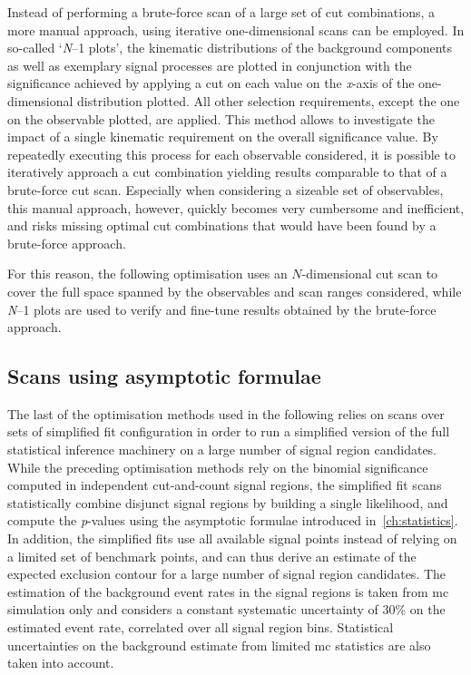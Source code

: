 Instead of performing a brute-force scan of a large set of cut combinations, a more manual approach, using iterative one-dimensional scans can be employed. In so-called `\textit{N}--1 plots', the kinematic distributions of the background components as well as exemplary signal processes are plotted in conjunction with the significance achieved by applying a cut on each value on the \textit{x}-axis of the one-dimensional distribution plotted. All other selection requirements, except the one on the observable plotted, are applied. This method allows to investigate the impact of a single kinematic requirement on the overall significance value. By repeatedly executing this process for each observable considered, it is possible to iteratively approach a cut combination yielding results comparable to that of a brute-force cut scan. Especially when considering a sizeable set of observables, this manual approach, however, quickly becomes very cumbersome and inefficient, and risks missing optimal cut combinations that would have been found by a brute-force approach.

For this reason, the following optimisation uses an $N$-dimensional cut scan to cover the full space spanned by the observables and scan ranges considered, while \textit{N}--1 plots are used to verify and fine-tune results obtained by the brute-force approach.

\subsection{Scans using asymptotic formulae}\label{sec:fit-scan}

The last of the optimisation methods used in the following relies on scans over sets of simplified fit configuration in order to run a simplified version of the full statistical inference machinery on a large number of signal region candidates.
While the preceding optimisation methods rely on the binomial significance computed in independent cut-and-count signal regions, the simplified fit scans statistically combine disjunct signal regions by building a single likelihood, and compute the \textit{p}-values using the asymptotic formulae introduced in~\cref{ch:statistics}.
In addition, the simplified fits use all available signal points instead of relying on a limited set of benchmark points, and can thus derive an estimate of the expected exclusion contour for a large number of signal region candidates.
The estimation of the background event rates in the signal regions is taken from \gls{mc} simulation only and considers a constant systematic uncertainty of 30\% on the estimated event rate, correlated over all signal region bins. Statistical uncertainties on the background estimate from limited \gls{mc} statistics are also taken into account. 

